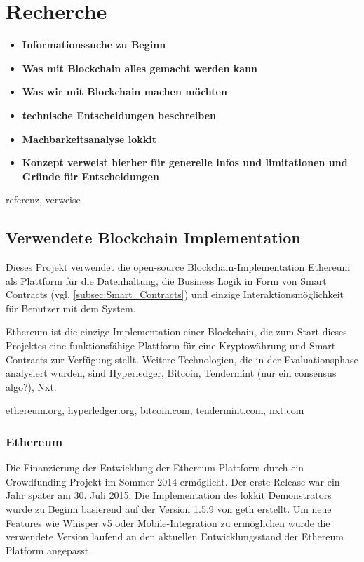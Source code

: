 \section{Recherche}
\label{sec:Blockchain}
\begin{itemize}
    \item \textbf{Informationssuche zu Beginn}
    \item \textbf{Was mit Blockchain alles gemacht werden kann}
    \item \textbf{Was wir mit Blockchain machen möchten}
    \item \textbf{technische Entscheidungen beschreiben}
    \item \textbf{Machbarkeitsanalyse lokkit}
    \item \textbf{Konzept verweist hierher für generelle infos und limitationen und Gründe für Entscheidungen}
\end{itemize}

referenz, verweise

\subsection{Verwendete Blockchain Implementation}
Dieses Projekt verwendet die open-source Blockchain-Implementation Ethereum als Plattform für die Datenhaltung, die Business Logik in Form von Smart Contracts (vgl. \ref{subsec:Smart_Contracts}) und einzige Interaktionsmöglichkeit für Benutzer mit dem System.

Ethereum ist die einzige Implementation einer Blockchain, die zum Start dieses Projektes eine funktionsfähige Plattform für eine Kryptowährung und Smart Contracts zur Verfügung stellt. Weitere Technologien, die in der Evaluationsphase analysiert wurden, sind Hyperledger, Bitcoin, Tendermint (nur ein consensus algo?), Nxt.\cite{ethereum.org, hyperledger.org}

ethereum.org, hyperledger.org, bitcoin.com, tendermint.com, nxt.com

\subsubsection{Ethereum}
Die Finanzierung der Entwicklung der Ethereum Plattform durch ein Crowdfunding Projekt im Sommer 2014 ermöglicht. Der erste Release war ein Jahr später am 30. Juli 2015. Die Implementation des lokkit Demonstrators wurde zu Beginn basierend auf der Version 1.5.9 von geth erstellt. Um neue Features wie Whisper v5 oder Mobile-Integration zu ermöglichen wurde die verwendete Version laufend an den aktuellen Entwicklungsstand der Ethereum Platform angepasst.\cite{ethereum.org}

